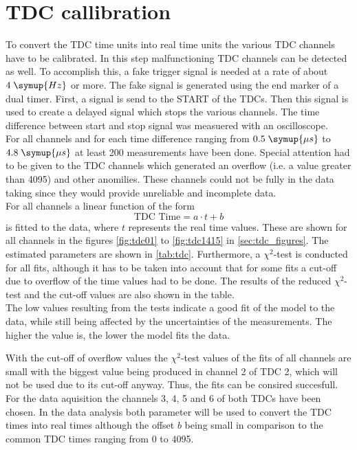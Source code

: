 \section{TDC callibration}
To convert the TDC time units into real time units the various TDC channels have to be calibrated.
In this step malfunctioning TDC channels can be detected as well. To accomplish this,
a fake trigger signal is needed at a rate of about $4 \; \symup{Hz}$ or more. The fake signal is generated using the 
end marker of a dual timer. First, a signal is send to the START of the TDCs. Then this signal is used 
to create a delayed signal which stops the various channels. The time difference between start and stop signal was measuered with 
an oscilloscope. \\
For all channels and for each time difference ranging from $0.5 \; \symup{\mu s}$ to $4.8 \; \symup{\mu s}$ 
at least 200 measurements have been done.
Special attention had to be given to the TDC channels which generated an overflow (i.e. a value greater than 4095)
and other anomilies.
These channels could not be fully in the data taking since they would provide unreliable
and incomplete data.\\
For all channels a linear function of the form 
\begin{equation*}
    \text{TDC Time} = a \cdot t + b
\end{equation*}
is fitted to the data, where $t$ represents the real time values.
These are shown for all channels in the figures \ref{fig:tdc01} to
\ref{fig:tdc1415} in \autoref{sec:tdc_figures}.
The estimated parameters are shown in \autoref{tab:tdc}. Furthermore, a $\chi^2$-test is conducted 
for all fits, although it has to be taken into account that for some fits a cut-off due to overflow of
the time values had to be done. The results of the reduced $\chi^2$-test and the cut-off values 
are also shown in the table.\\
The low values resulting from the tests indicate a good fit of the model to the data, while still being affected by the uncertainties 
of the measurements. The higher the value is, the lower the model fits the data.

With the cut-off of overflow values the $\chi^2$-test values of the fits of all channels are 
small with the biggest value being produced in channel 2 of TDC 2, which will not be used due to 
its cut-off anyway. Thus, the fits can be consired succesfull. 
For the data aquisition the channels 3, 4, 5 and 6 of both TDCs have been chosen.
In the data analysis both parameter will be used to convert the TDC times into real times although the 
offset $b$ being small in comparison to the common TDC times ranging from 0 to 4095.


